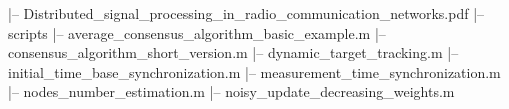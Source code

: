 \begtt

|-- Distributed_signal_processing_in_radio_communication_networks.pdf
|-- scripts
    |-- average_consensus_algorithm_basic_example.m
    |-- consensus_algorithm_short_version.m
    |-- dynamic_target_tracking.m
    |-- initial_time_base_synchronization.m
    |-- measurement_time_synchronization.m
    |-- nodes_number_estimation.m
    |-- noisy_update_decreasing_weights.m


\endtt
